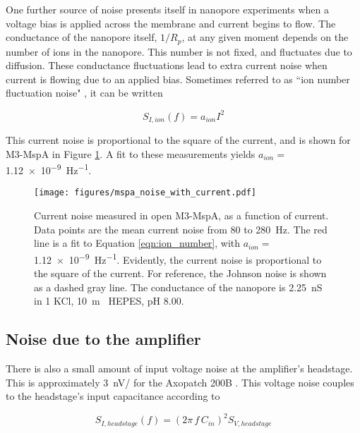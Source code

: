 One further source of noise presents itself in nanopore experiments when a voltage bias is applied across the membrane and current begins to flow.  The conductance of the nanopore itself, $1/R_p$, at any given moment depends on the number of ions in the nanopore.  This number is not fixed, and fluctuates due to diffusion.  These conductance fluctuations lead to extra current noise when current is flowing due to an applied bias.  Sometimes referred to as ``ion number fluctuation noise" \citep{Hoogerheide2010}, it can be written

\begin{equation}
S_{I,ion}(f) = a_{ion} I^2
\label{eqn:ion_number}
\end{equation}

This current noise is proportional to the square of the current, and is shown for M3-MspA in Figure \ref{fig:mspa_noise}.  A fit to these measurements yields $a_{ion} =$ \SI{1.12e-9}{\Hz^{-1}}.

\begin{figure}[h]
\begin{centering}
\texttt{[image: figures/mspa\_noise\_with\_current.pdf]}
\caption[Current noise in MspA depends on current]{Current noise measured in open M3-MspA, as a function of current.  Data points are the mean current noise from \num{80} to \SI{280}{\Hz}.  The red line is a fit to Equation \ref{eqn:ion_number}, with $a_{ion} = $ \SI{1.12e-9}{\Hz^{-1}}.  Evidently, the current noise is proportional to the square of the current.  For reference, the Johnson noise is shown as a dashed gray line.  The conductance of the nanopore is \SI{2.25}{\nano\siemens} in \SI{1}{\Molar} KCl, \SI{10}{\m\Molar} HEPES, pH \num{8.00}.}
\label{fig:mspa_noise}
\end{centering}
\end{figure}

\subsection{Noise due to the amplifier}

There is also a small amount of input voltage noise at the amplifier's headstage.  This is approximately \SI{3}{\nV/\sqrt{\Hz}} for the Axopatch 200B \citep{Sakmann1995}.  This voltage noise couples to the headstage's input capacitance according to

\begin{equation}
S_{I,headstage}(f) = (2 \pi \, f \, C_{in})^2 S_{V,headstage}
\label{eqn:headstage}
\end{equation}

